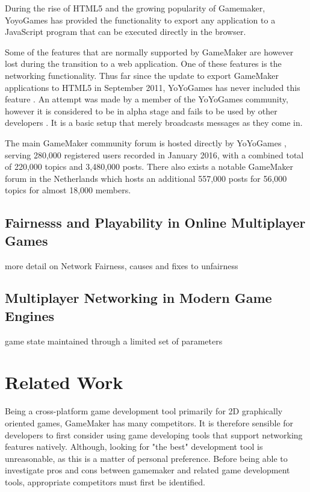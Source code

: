 \documentclass[bsc,frontabs,twoside,singlespacing,parskip,deptreport]{infthesis}     %
\begin{document}
During the rise of HTML5 and the growing popularity of Gamemaker, YoyoGames has provided the functionality to export any application to a JavaScript program that can be executed directly in the browser\cite{GameMaker_Studio}.

Some of the features that are normally supported by GameMaker are however lost during the transition to a web application. One of these features is the networking functionality. Thus far since the update to export GameMaker applications to HTML5 in September 2011, YoYoGames has never included this feature \cite{gamemaker_missing_networking}. An attempt was made by a member of the YoYoGames community, however it is considered to be in alpha stage and fails to be used by other developers \cite{gamemaker_networking_attempt}. It is a basic setup that merely broadcasts messages as they come in.%

The main GameMaker community forum is hosted directly by YoYoGames \cite{yoyogames_forum}, serving 280,000 registered users recorded in January 2016, with a combined total of 220,000 topics and 3,480,000 posts. There also exists a notable GameMaker forum in the Netherlands\cite{dutch_gamemaker_forum} which hosts an additional 557,000 posts for 56,000 topics for almost 18,000 members.

\section{Fairnesss and Playability in Online Multiplayer Games}

more detail on Network Fairness, causes and fixes to unfairness

\section{Multiplayer Networking in Modern Game Engines}
game state maintained through a limited set of parameters

\chapter{Related Work}
Being a cross-platform game development tool primarily for 2D graphically oriented games, GameMaker has many competitors. It is therefore sensible for developers to first consider using game developing tools that support networking features natively. Although, looking for "the best" development tool is unreasonable, as this is a matter of personal preference. Before being able to investigate pros and cons between gamemaker and related game development tools, appropriate competitors must first be identified.
\end{document}
